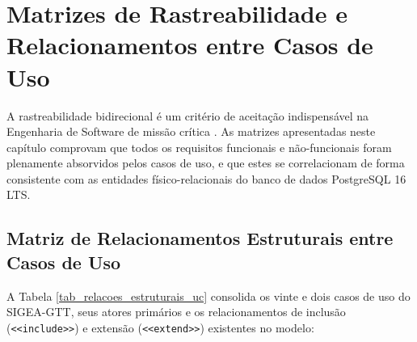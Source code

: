 \chapter{Matrizes de Rastreabilidade e Relacionamentos entre Casos de Uso}
\label{cap_matrizes_rastreabilidade}

A rastreabilidade bidirecional é um critério de aceitação indispensável na Engenharia de Software de missão crítica \cite{iso29148}. As matrizes apresentadas neste capítulo comprovam que todos os requisitos funcionais e não-funcionais foram plenamente absorvidos pelos casos de uso, e que estes se correlacionam de forma consistente com as entidades físico-relacionais do banco de dados PostgreSQL 16 LTS.

\section{Matriz de Relacionamentos Estruturais entre Casos de Uso}
\label{sec_matriz_relacoes_uc}

A Tabela \ref{tab_relacoes_estruturais_uc} consolida os vinte e dois casos de uso do SIGEA-GTT, seus atores primários e os relacionamentos de inclusão (\texttt{<<include>>}) e extensão (\texttt{<<extend>>}) existentes no modelo:

